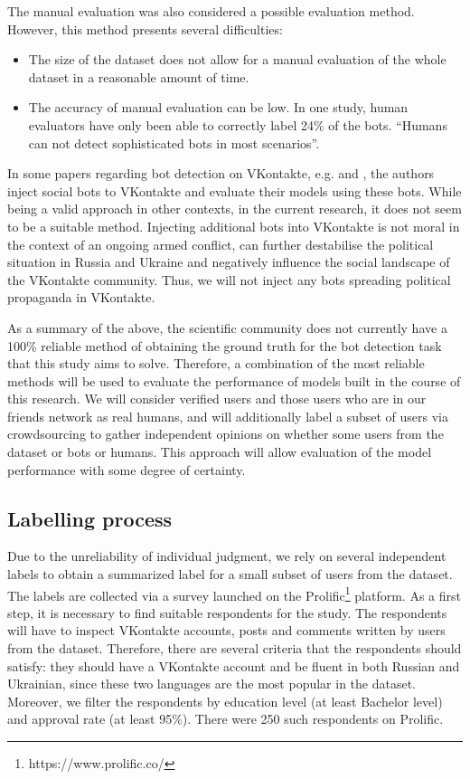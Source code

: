 The manual evaluation was also considered a possible evaluation method. However, this method presents several difficulties:
\begin{itemize}
    \item The size of the dataset does not allow for a manual evaluation of the whole dataset in a reasonable amount of time.
    \item The accuracy of manual evaluation can be low. In one study, human evaluators have only been able to correctly label 24\% of the bots\cite{Cresci2017a}. ``Humans can not detect sophisticated bots in most scenarios''\cite{Kolomeets}.
\end{itemize}

In some papers regarding bot detection on VKontakte, e.g. \cite{Kolomeets2021} and \cite{Kolomeets2021a}, the authors inject social bots to VKontakte and evaluate their models using these bots. While being a valid approach in other contexts, in the current research, it does not seem to be a suitable method. Injecting additional bots into VKontakte is not moral in the context of an ongoing armed conflict, can further destabilise the political situation in Russia and Ukraine and negatively influence the social landscape of the VKontakte community. Thus, we will not inject any bots spreading political propaganda in VKontakte.

As a summary of the above, the scientific community does not currently have a 100\% reliable method of obtaining the ground truth for the bot detection task that this study aims to solve. Therefore, a combination of the most reliable methods will be used to evaluate the performance of models built in the course of this research. We will consider verified users and those users who are in our friends network as real humans, and will additionally label a subset of users via crowdsourcing to gather independent opinions on whether some users from the dataset or bots or humans. This approach will allow evaluation of the model performance with some degree of certainty. 

\subsection{Labelling process}
\label{sec:labelling}
Due to the unreliability of individual judgment, we rely on several independent labels to obtain a summarized label for a small subset of users from the dataset. The labels are collected via a survey launched on the Prolific\footnote{https://www.prolific.co/} platform. As a first step, it is necessary to find suitable respondents for the study. The respondents will have to inspect VKontakte accounts, posts and comments written by users from the dataset. Therefore, there are several criteria that the respondents should satisfy: they should have a VKontakte account and be fluent in both Russian and Ukrainian, since these two languages are the most popular in the dataset. Moreover, we filter the respondents by education level (at least Bachelor level) and approval rate (at least 95\%). There were 250 such respondents on Prolific.

